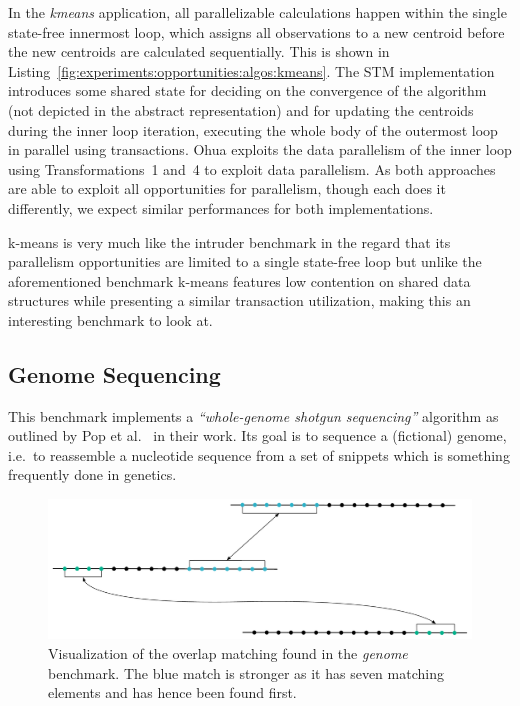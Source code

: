 In the \emph{kmeans} application, all parallelizable calculations happen within the single state-free innermost loop, which assigns all observations to a new centroid before the new centroids are calculated sequentially.
This is shown in Listing~\ref{fig:experiments:opportunities:algos:kmeans}.
The STM implementation introduces some shared state for deciding on the convergence of the algorithm (not depicted in the abstract representation) and for updating the centroids during the inner loop iteration, executing the whole body of the outermost loop in parallel using transactions.
Ohua exploits the data parallelism of the inner loop using Transformations~1 and~4 to exploit data parallelism.
As both approaches are able to exploit all opportunities for parallelism, though each does it differently, we expect similar performances for both implementations.

k-means is very much like the intruder benchmark in the regard that its parallelism opportunities are limited to a single state-free loop but unlike the aforementioned benchmark k-means features low contention on shared data structures while presenting a similar transaction utilization, making this an interesting benchmark to look at.

\subsection{Genome Sequencing}
\label{sec:experiments:genome}
This benchmark implements a \emph{\enquote{whole-genome shotgun sequencing}} algorithm as outlined by Pop et al.~\cite{pop2002genome} in their work.
Its goal is to sequence a (fictional) genome, i.e.\ to reassemble a nucleotide sequence from a set of snippets which is something frequently done in genetics.

\begin{figure}
    \includegraphics[width=\textwidth,keepaspectratio]{gfx/experiments-genome}
    \caption{Visualization of the overlap matching found in the \emph{genome} benchmark. The blue match is stronger as it has seven matching elements and has hence been found first.}
    \label{fig:experiments:genome-example}
\end{figure}

